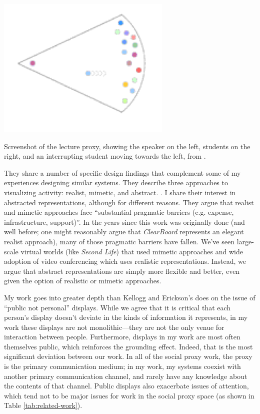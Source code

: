 \begin{marginfigure}
	\includegraphics{figures/lecture.png}
	\caption{Screenshot of the lecture proxy, showing the speaker on the left, students on the right, and an interrupting student moving towards the left, from \citep{Erickson:2003td}.}
	\label{fig:proxy-lecture}
\end{marginfigure}

They share a number of specific design findings that complement some of my experiences designing similar systems. They describe three approaches to visualizing activity: realist, mimetic, and abstract. \citep{Erickson:2003td}. I share their interest in abstracted representations, although for different reasons. They argue that realist and mimetic approaches face ``substantial pragmatic barriers (e.g. expense, infrastructure, support)''. In the years since this work was originally done (and well before; one might reasonably argue that \emph{ClearBoard} \citep{Ishii:1992bq} represents an elegant realist approach), many of those pragmatic barriers have fallen. We've seen large-scale virtual worlds (like \emph{Second Life}) that used mimetic approaches and wide adoption of video conferencing which uses realistic representations. Instead, we argue that abstract representations are simply more flexible and better, even given the option of realistic or mimetic approaches.


My work goes into greater depth than Kellogg and Erickson's does on the issue of ``public not personal'' displays. While we agree that it is critical that each person's display doesn't deviate in the kinds of information it represents, in my work these displays are not monolithic---they are not the only venue for interaction between people. Furthermore, displays in my work are most often themselves public, which reinforces the grounding effect. Indeed, that is the most significant deviation between our work. In all of the social proxy work, the proxy is the primary communication medium; in my work, my systems coexist with another primary communication channel, and rarely have any knowledge about the contents of that channel. Public displays also exacerbate issues of attention, which tend not to be major issues for work in the social proxy space (as shown in Table \ref{tab:related-work}). 

